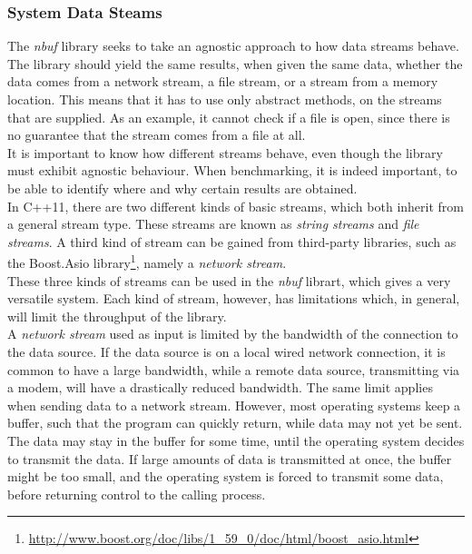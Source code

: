 \documentclass[a4paper]{article}
\newcommand{\nbuf}{\textit{nbuf} }
\begin{document}
\subsubsection{System Data Steams}
The \nbuf library seeks to take an agnostic approach to how data streams behave. The library should yield the same results, when given the same data, whether the data comes from a network stream, a file stream, or a stream from a memory location. This means that it has to use only abstract methods, on the streams that are supplied. As an example, it cannot check if a file is open, since there is no guarantee that the stream comes from a file at all.\\

It is important to know how different streams behave, even though the library must exhibit agnostic behaviour. When benchmarking, it is indeed important, to be able to identify where and why certain results are obtained.\\

In C++11, there are two different kinds of basic streams, which both inherit from a general stream type. These streams are known as \textit{string streams} and \textit{file streams}. A third kind of stream can be gained from third-party libraries, such as the Boost.Asio library\footnote{ \url{http://www.boost.org/doc/libs/1\_59\_0/doc/html/boost\_asio.html}}, namely a \textit{network stream}.\\

These three kinds of streams can be used in the \nbuf librart, which gives a very versatile system. Each kind of stream, however, has limitations which, in general, will limit the throughput of the library.\\

A \textit{network stream} used as input is limited by the bandwidth of the connection to the data source. If the data source is on a local wired network connection, it is common to have a large bandwidth, while a remote data source, transmitting via a modem, will have a drastically reduced bandwidth. The same limit applies when sending data to a network stream. However, most operating systems keep a buffer, such that the program can quickly return, while data may not yet be sent. The data may stay in the buffer for some time, until the operating system decides to transmit the data. If large amounts of data is transmitted at once, the buffer might be too small, and the operating system is forced to transmit some data, before returning control to the calling process.\\
\end{document}
